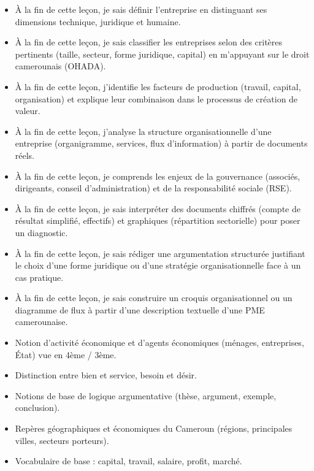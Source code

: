 \documentclass[11pt]{article}
\begin{document}
\begin{objectifs}
\begin{itemize}
\item À la fin de cette leçon, je sais définir l'entreprise en distinguant ses dimensions technique, juridique et humaine.
\item À la fin de cette leçon, je sais classifier les entreprises selon des critères pertinents (taille, secteur, forme juridique, capital) en m'appuyant sur le droit camerounais (OHADA).
\item À la fin de cette leçon, j'identifie les facteurs de production (travail, capital, organisation) et explique leur combinaison dans le processus de création de valeur.
\item À la fin de cette leçon, j'analyse la structure organisationnelle d'une entreprise (organigramme, services, flux d'information) à partir de documents réels.
\item À la fin de cette leçon, je comprends les enjeux de la gouvernance (associés, dirigeants, conseil d'administration) et de la responsabilité sociale (RSE).
\item À la fin de cette leçon, je sais interpréter des documents chiffrés (compte de résultat simplifié, effectifs) et graphiques (répartition sectorielle) pour poser un diagnostic.
\item À la fin de cette leçon, je sais rédiger une argumentation structurée justifiant le choix d'une forme juridique ou d'une stratégie organisationnelle face à un cas pratique.
\item À la fin de cette leçon, je sais construire un croquis organisationnel ou un diagramme de flux à partir d'une description textuelle d'une PME camerounaise.
\end{itemize}
\end{objectifs}

\begin{prerequis}
\begin{itemize}
\item Notion d'activité économique et d'agents économiques (ménages, entreprises, État) vue en 4ème / 3ème.
\item Distinction entre bien et service, besoin et désir.
\item Notions de base de logique argumentative (thèse, argument, exemple, conclusion).
\item Repères géographiques et économiques du Cameroun (régions, principales villes, secteurs porteurs).
\item Vocabulaire de base : capital, travail, salaire, profit, marché.
\end{itemize}
\end{prerequis}
\end{document}
